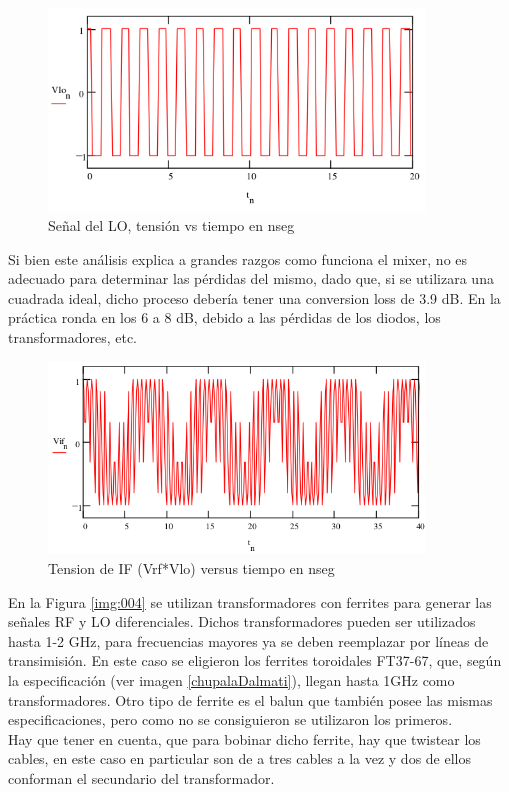 \documentclass[a4paper,10pt]{article}
\begin{document}
	\begin{figure}[!htb]
		\centering
		\includegraphics[width=10cm]{Images/VLO.png}
		\caption{Señal del LO, tensión vs tiempo en nseg}
		\label{img:006}
	\end{figure}
	
	\indent Si bien este análisis explica a grandes razgos como funciona el 
	mixer, no es adecuado para determinar las pérdidas del mismo, dado que, si 
	se utilizara una cuadrada ideal, dicho proceso debería tener una conversion
	loss de 3.9 dB. En la práctica ronda en los 6 a 8 dB, debido a las pérdidas
	de los diodos, los transformadores, etc. \\
	
	\begin{figure}[!htb]
		\centering
		\includegraphics[width=10cm]{Images/VIF.png}
		\caption{Tension de IF (Vrf*Vlo) versus tiempo en nseg}
		\label{img:007}
	\end{figure}

	\indent En la Figura \ref{img:004} se utilizan transformadores con ferrites 
	para generar las señales RF y LO diferenciales. Dichos transformadores 
	pueden ser utilizados hasta 1-2 GHz, para frecuencias mayores ya se deben 
	reemplazar por líneas de transimisión. En este caso se eligieron los 
	ferrites toroidales FT37-67, que, según la especificación (ver imagen 
	\ref{chupalaDalmati}), llegan hasta 1GHz como transformadores. Otro tipo de 
	ferrite es el balun que tambi\'en posee las mismas especificaciones, pero 
	como no se consiguieron se utilizaron los primeros.\\
	\indent Hay que tener en cuenta, que para bobinar dicho ferrite, hay que 
	twistear los cables, en este caso en particular son de a tres cables a la 
	vez y dos de ellos conforman el secundario del transformador.
\end{document}
